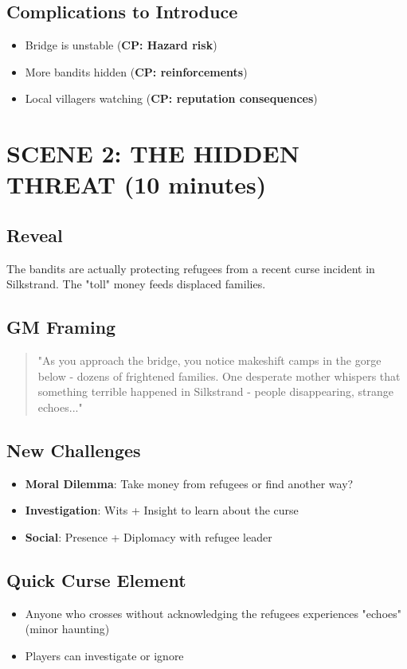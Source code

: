 \documentclass[12pt]{article}
\newcommand{\cp}[1]{\textbf{CP: #1}}
\begin{document}
\subsection*{Complications to Introduce}
\begin{itemize}
\item Bridge is unstable (\cp{Hazard risk})
\item More bandits hidden (\cp{reinforcements})
\item Local villagers watching (\cp{reputation consequences})
\end{itemize}

\section{SCENE 2: THE HIDDEN THREAT (10 minutes)}

\subsection*{Reveal}
The bandits are actually protecting refugees from a recent curse incident in Silkstrand. The "toll" money feeds displaced families.

\subsection*{GM Framing}
\begin{quote}
"As you approach the bridge, you notice makeshift camps in the gorge below - dozens of frightened families. One desperate mother whispers that something terrible happened in Silkstrand - people disappearing, strange echoes..."
\end{quote}

\subsection*{New Challenges}
\begin{itemize}
\item \textbf{Moral Dilemma}: Take money from refugees or find another way?
\item \textbf{Investigation}: Wits + Insight to learn about the curse
\item \textbf{Social}: Presence + Diplomacy with refugee leader
\end{itemize}

\subsection*{Quick Curse Element}
\begin{itemize}
\item Anyone who crosses without acknowledging the refugees experiences "echoes" (minor haunting)
\item Players can investigate or ignore
\end{itemize}
\end{document}
